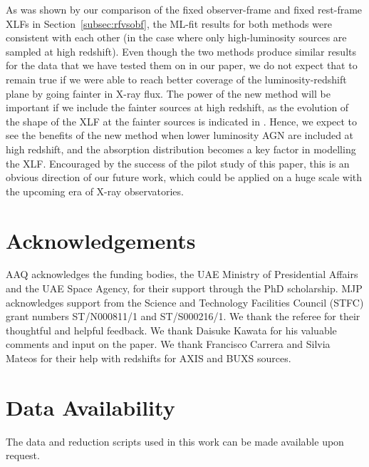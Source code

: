 \documentclass[fleqn,usenatbib]{mnras}
\begin{document}
As was shown by our comparison of the fixed observer-frame and fixed rest-frame XLFs in Section~\ref{subsec:rfvsobf}, the ML-fit results for both methods were consistent with each other (in the case where only high-luminosity sources are sampled at high redshift).
Even though the two methods produce similar results for the data that we have tested them on in our paper, we do not expect that to remain true if we were able to reach better coverage of the luminosity-redshift plane by going fainter in X-ray flux.
The power of the new method will be important if we include the fainter sources at high redshift, as the evolution of the shape of the XLF at the fainter sources is indicated in \citet{ebrero2009xmm, aird2015evolution}.
Hence, we expect to see the benefits of the new method when lower luminosity AGN are included at high redshift, and the absorption distribution becomes a key factor in modelling the XLF.
Encouraged by the success of the pilot study of this paper, this is an obvious direction of our future work, which could be applied on a huge scale with the upcoming era of X-ray observatories.




\section*{Acknowledgements}

AAQ acknowledges the funding bodies, the UAE Ministry of Presidential Affairs and the UAE Space Agency, for their support through the PhD scholarship.
MJP acknowledges support from the Science and Technology Facilities Council (STFC) grant numbers ST/N000811/1 and ST/S000216/1.
We thank the referee for their thoughtful and helpful feedback.
We thank Daisuke Kawata for his valuable comments and input on the paper.
We thank Francisco Carrera and Silvia Mateos for their help with redshifts for AXIS and BUXS sources.



\section*{Data Availability}
The data and reduction scripts used in this work can be made available upon request.





\end{document}
